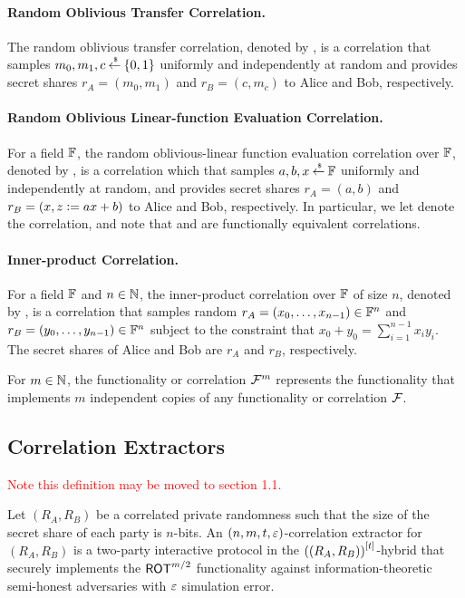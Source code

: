 \paragraph{Random Oblivious Transfer Correlation.}
The random oblivious transfer correlation, denoted by \ROT, is a correlation that samples $m_0,m_1,c \mathbin{\stackrel{\mbox{\,\tiny \$}}{\gets}} {\{0,1\}}$ uniformly and independently at random and provides secret shares $r_A = (m_0,m_1)$ and $r_B = (c,m_c)$ to Alice and Bob, respectively.

\paragraph{Random Oblivious Linear-function Evaluation Correlation.}
For a field ${\mathbb F}$, the random oblivious-linear function evaluation correlation over ${\mathbb F}$, denoted by \ROLE[\bbF], is a correlation which that samples $a,b,x \mathbin{\stackrel{\mbox{\,\tiny \$}}{\gets}} {\mathbb F}$ uniformly and independently at random, and provides secret shares $r_A = (a,b)$ and $r_B = (x, z {\;\vcentcolon=\;} ax+b)$ to Alice and Bob, respectively.
In particular, we let \ROLE denote the \ROLE[\GF{2}] correlation, and note that \ROT and \ROLE are functionally equivalent correlations.

\paragraph{Inner-product Correlation.}
For a field ${\mathbb F}$ and $n \in {\mathbb N}$, the inner-product correlation over ${\mathbb F}$ of size $n$, denoted by \IP[\bbF^n], is a correlation that samples random $r_A = (x_0,\dotsc, x_{n-1}) \in {\mathbb F}^n$ and $r_B = (y_0,\dotsc, y_{n-1}) \in {\mathbb F}^n$ subject to the constraint that $x_0 + y_0 = \sum_{i=1}^{n-1} x_iy_i$.
The secret shares of Alice and Bob are $r_A$ and $r_B$, respectively.

For $m \in {\mathbb N}$, the functionality or correlation ${\mathcal F}^m$ represents the functionality that implements $m$ independent copies of any functionality or correlation ${\mathcal F}$.

\subsection{Correlation Extractors}\label{sec:prelim-corr-ext}

\textcolor{red}{Note this definition may be moved to section 1.1.}
\begin{definition}
	Let $(R_A, R_B)$ be a correlated private randomness such that the size of the secret share of each party is $n$-bits.
	An $(n,m,t,\varepsilon)$-correlation extractor for $(R_A, R_B)$ is a two-party interactive protocol in the $\left({(R_A,R_B)}\right)^{[t]}$-hybrid that securely implements the $\ROT[m/2]$ functionality against information-theoretic semi-honest adversaries with $\varepsilon$ simulation error.
\end{definition}

